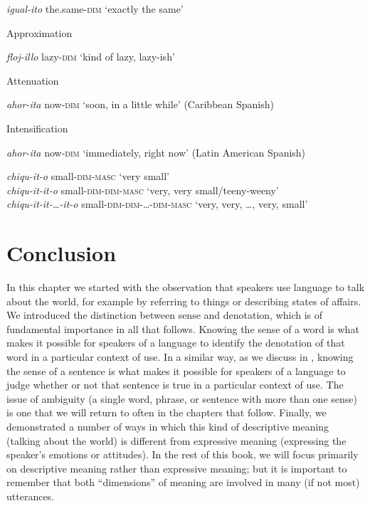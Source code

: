 \textit{igual-ito}  the.same-\textsc{dim}  ‘exactly the same’

\ex Approximation

\textit{floj-illo}  lazy-\textsc{dim}  ‘kind of lazy, lazy-ish’

\ex Attenuation

\textit{ahor-ita}  now-\textsc{dim}  ‘soon, in a little while’ (Caribbean Spanish)

\ex Intensification

\textit{ahor-ita}  now-\textsc{dim}  ‘immediately, right now’ (Latin American Spanish)

\textit{chiqu-it-o}  small-\textsc{dim-masc}  ‘very small’\\
\textit{chiqu-it-it-o}  small-\textsc{dim-dim-masc}  ‘very, very small/teeny-weeny’\\
\textit{chiqu-it-it-…-it-o}  small-\textsc{dim}-\textsc{dim}-\textsc{…}-\textsc{dim}-\textsc{masc} ‘very, very, …, very, small’
\z
\z
\section{Conclusion}\label{sec:2.7}

In this chapter we started with the observation that speakers use language to talk about the world, for example by referring to things or describing states of affairs. We introduced the distinction between sense and denotation, which is of fundamental importance in all that follows. Knowing the sense of a word is what makes it possible for speakers of a language to identify the denotation of that word in a particular context of use. In a similar way, as we discuss in , knowing the sense of a sentence is what makes it possible for speakers of a language to judge whether or not that sentence is true in a particular context of use. The issue of ambiguity (a single word, phrase, or sentence with more than one sense) is one that we will return to often in the chapters that follow. Finally, we demonstrated a number of ways in which this kind of descriptive meaning (talking about the world) is different from expressive meaning (expressing the speaker’s emotions or attitudes). In the rest of this book, we will focus primarily on descriptive meaning rather than expressive meaning; but it is important to remember that both “dimensions” of meaning are involved in many (if not most) utterances.



